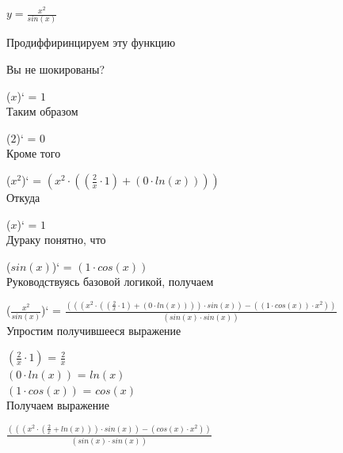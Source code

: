 \documentclass[12pt,a4paper,fleqn]{article}
\begin{document}
$y = $$\frac{x^{2}}{sin(x)}$

 Продиффиринцируем эту функцию

Вы не шокированы?

($x$)` = $1$\\
Таким образом

($2$)` = $0$\\
Кроме того

($x^{2}$)` = $(x^{2} \cdot ((\frac{2}{x} \cdot 1) + (0 \cdot ln(x))))$\\
Откуда

($x$)` = $1$\\
Дураку понятно, что

($sin(x)$)` = $(1 \cdot cos(x))$\\
Руководствуясь базовой логикой, получаем

($\frac{x^{2}}{sin(x)}$)` = $\frac{(((x^{2} \cdot ((\frac{2}{x} \cdot 1) + (0 \cdot ln(x)))) \cdot sin(x)) - ((1 \cdot cos(x)) \cdot x^{2}))}{(sin(x) \cdot sin(x))}$\\


Упростим получившееся выражение

$(\frac{2}{x} \cdot 1)$ = $\frac{2}{x}$\\
$(0 \cdot ln(x))$ = $ln(x)$\\
$(1 \cdot cos(x))$ = $cos(x)$\\


 Получаем выражение

$\frac{(((x^{2} \cdot (\frac{2}{x} + ln(x))) \cdot sin(x)) - (cos(x) \cdot x^{2}))}{(sin(x) \cdot sin(x))}$
\end{document}
